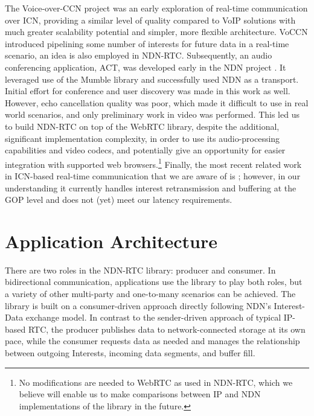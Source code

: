 \documentclass{icn/sig-alternate-2013} %
\newcommand{\ndnrtcName}{NDN-RTC} %
\begin{document}
The Voice-over-CCN project \cite{voccn} was an early exploration of real-time communication over ICN, providing a similar level of quality compared to VoIP solutions with much greater scalability potential and simpler, more flexible architecture. VoCCN introduced pipelining some number of interests for future data in a real-time scenario, an idea is also employed in \ndnrtcName{}. Subsequently, an audio conferencing application, ACT, was developed early in the NDN project \cite{act-tool}. It leveraged use of the Mumble library and successfully used NDN as a transport.  Initial effort for conference and user discovery was made in this work as well. %
However, echo cancellation quality was poor, which made it difficult to use in real world scenarios, and only preliminary work in video was performed. This led us to build \ndnrtcName{} on top of the WebRTC library, despite the additional, significant implementation complexity, in order to use its audio-processing capabilities and video codecs, and potentially give an opportunity for easier integration with supported web browsers.\footnote{No  modifications are needed to WebRTC \cite{webrtc}  as used in \ndnrtcName{}, which we believe will enable us to make comparisons between IP and NDN implementations of the library in the future.}  Finally, the most recent related work in ICN-based real-time communication that we are aware of is \cite{huawei-rtc}; however, in our understanding it currently handles interest retransmission and buffering at the GOP level and does not (yet) meet our latency requirements.


\section{Application Architecture}
\label{sec:arch}

There are two roles in the \ndnrtcName{} library: producer and consumer.  In bidirectional communication, applications use the library to play both roles, but a variety of other multi-party and one-to-many scenarios can be achieved.  The library is built on a consumer-driven approach directly following NDN's Interest-Data exchange model.  In contrast to the sender-driven approach of typical IP-based RTC, the producer publishes data to network-connected storage at its own pace, while the consumer requests data as needed and manages the relationship between outgoing Interests, incoming data segments, and buffer fill. 
%
\end{document}
